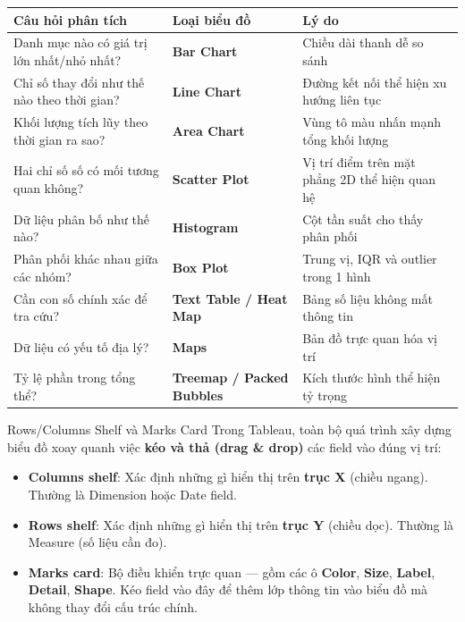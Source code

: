 \documentclass[12pt]{article}
\begin{document}
\begin{center}
\renewcommand{\arraystretch}{1.4}
\begin{tabularx}{\linewidth}{>{\raggedright\arraybackslash}X >{\raggedright\arraybackslash}p{3.5cm} >{\raggedright\arraybackslash}X}
\toprule
\textbf{Câu hỏi phân tích} & \textbf{Loại biểu đồ} & \textbf{Lý do} \\
\midrule
Danh mục nào có giá trị lớn nhất/nhỏ nhất? & \textbf{Bar Chart} & Chiều dài thanh dễ so sánh \\
Chỉ số thay đổi như thế nào theo thời gian? & \textbf{Line Chart} & Đường kết nối thể hiện xu hướng liên tục \\
Khối lượng tích lũy theo thời gian ra sao? & \textbf{Area Chart} & Vùng tô màu nhấn mạnh tổng khối lượng \\
Hai chỉ số số có mối tương quan không? & \textbf{Scatter Plot} & Vị trí điểm trên mặt phẳng 2D thể hiện quan hệ \\
Dữ liệu phân bố như thế nào? & \textbf{Histogram} & Cột tần suất cho thấy phân phối \\
Phân phối khác nhau giữa các nhóm? & \textbf{Box Plot} & Trung vị, IQR và outlier trong 1 hình \\
Cần con số chính xác để tra cứu? & \textbf{Text Table / Heat Map} & Bảng số liệu không mất thông tin \\
Dữ liệu có yếu tố địa lý? & \textbf{Maps} & Bản đồ trực quan hóa vị trí \\
Tỷ lệ phần trong tổng thể? & \textbf{Treemap / Packed Bubbles} & Kích thước hình thể hiện tỷ trọng \\
\bottomrule
\end{tabularx}
\end{center}

\begin{conceptbox}{Rows/Columns Shelf và Marks Card}
Trong Tableau, toàn bộ quá trình xây dựng biểu đồ xoay quanh việc \textbf{kéo và thả (drag \& drop)} các field vào đúng vị trí:
\begin{itemize}[nosep]
    \item \textbf{Columns shelf}: Xác định những gì hiển thị trên \textbf{trục X} (chiều ngang). Thường là Dimension hoặc Date field.
    \item \textbf{Rows shelf}: Xác định những gì hiển thị trên \textbf{trục Y} (chiều dọc). Thường là Measure (số liệu cần đo).
    \item \textbf{Marks card}: Bộ điều khiển trực quan --- gồm các ô \textbf{Color}, \textbf{Size}, \textbf{Label}, \textbf{Detail}, \textbf{Shape}. Kéo field vào đây để thêm lớp thông tin vào biểu đồ mà không thay đổi cấu trúc chính.
\end{itemize}
\end{conceptbox}
\end{document}
